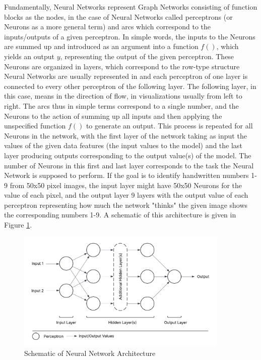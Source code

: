 Fundamentally, Neural Networks represent Graph Networks consisting of function blocks as the nodes, in the case of Neural Networks called perceptrons (or Neurons as a more general term) and arcs which correspond to the inputs/outputs of a given perceptron. In simple words, the inputs to the Neurons are summed up and introduced as an argument into a function $f()$, which yields an output $y$, representing the output of the given perceptron. These Neurons are organized in layers, which correspond to the row-type structure Neural Networks are usually represented in and each perceptron of one layer is connected to every other perceptron of the following layer. The following layer, in this case, means in the direction of flow, in visualizations usually from left to right. The arcs thus in simple terms correspond to a single number, and the Neurons to the action of summing up all inputs and then applying the unspecified function $f()$ to generate an output. This process is repeated for all Neurons in the network, with the first layer of the network taking as input the values of the given data features (the input values to the model) and the last layer producing outputs corresponding to the output value(s) of the model. The number of Neurons in this first and last layer corresponds to the task the Neural Network is supposed to perform. If the goal is to identify handwritten numbers 1-9 from 50x50 pixel images, the input layer might have 50x50 Neurons for the value of each pixel, and the output layer 9 layers with the output value of each perceptron representing how much the network "thinks" the given image shows the corresponding numbers 1-9. A schematic of this architecture is given in Figure \ref{fig:neural_network_architecture}.

\begin{figure}[h] 
\centering
\includegraphics[width=0.9\textwidth]{figures/modelling/neural_network_concept.png} %
\caption{Schematic of Neural Network Architecture}
\label{fig:neural_network_architecture}
\end{figure}

